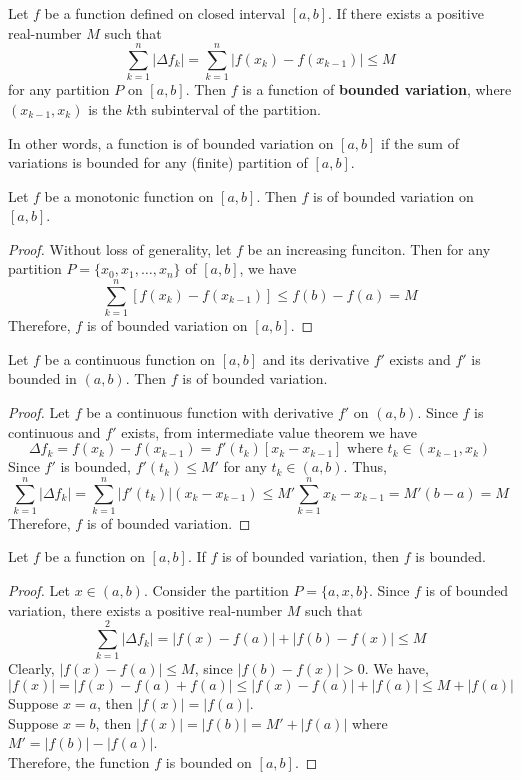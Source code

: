 \begin{definition}
	Let $f$ be a function defined on closed interval $[a,b]$.
	If there exists a positive real-number $M$ such that
	\[ \sum_{k=1}^n |\Delta f_k| = \sum_{k=1}^n |f(x_k) - f(x_{k-1})| \le M \]
	for any partition $P$ on $[a,b]$.
	Then $f$ is a function of \textbf{bounded variation}, where $(x_{k-1},x_k)$ is the $k$th subinterval of the partition.\\

\begin{commentary}
	In other words, a function is of bounded variation on $[a,b]$ if the sum of variations is bounded for any (finite) partition of $[a,b]$.
\end{commentary}
\end{definition}

\begin{theorem}
	Let $f$ be a monotonic function on $[a,b]$.
	Then $f$ is of bounded variation on $[a,b]$.
\end{theorem}
\begin{proof}
	Without loss of generality, let $f$ be an increasing funciton.
	Then for any partition $P = \{x_0,x_1,\dots,x_n\}$ of $[a,b]$, we have
	\[ \sum_{k=1}^n \left[ f(x_k)-f(x_{k-1}) \right] \le f(b)-f(a) = M \]
	Therefore, $f$ is of bounded variation on $[a,b]$.
\end{proof}

\begin{theorem}
	Let $f$ be a continuous function on $[a,b]$ and its derivative $f'$ exists and $f'$ is bounded in $(a,b)$.
	Then $f$ is of bounded variation.	
\end{theorem}
\begin{proof}
	Let $f$ be a continuous function with derivative $f'$ on $(a,b)$.
	Since $f$ is continuous and $f'$ exists, from intermediate value theorem we have
	\[ \Delta f_k = f(x_k) - f(x_{k-1}) = f'(t_k) [x_k-x_{k-1}] \text{ where } t_k \in (x_{k-1},x_k) \]
	Since $f'$ is bounded, $f'(t_k) \le M'$ for any $t_k \in (a,b)$.
	Thus,
	\[ \sum_{k=1}^n |\Delta f_k| = \sum_{k=1}^n |f'(t_k)| (x_k-x_{k-1}) \le M'\sum_{k=1}^n x_k-x_{k-1} = M'(b-a) = M \]
	Therefore, $f$ is of bounded variation.
\end{proof}

\begin{theorem}
	Let $f$ be a function on $[a,b]$.
	If $f$ is of bounded variation, then $f$ is bounded.
\end{theorem}
\begin{proof}
	Let $x \in (a,b)$.
	Consider the partition $P = \{ a,x,b \}$.
	Since $f$ is of bounded variation, there exists a positive real-number $M$ such that
	\[ \sum_{k=1}^2 |\Delta f_k| = |f(x)-f(a)| + |f(b)-f(x)| \le M \]
	Clearly, $|f(x)-f(a)| \le M$, since $|f(b)-f(x)| > 0$.
	We have,
	\[ |f(x)| = |f(x)-f(a)+f(a)| \le |f(x)-f(a)|+|f(a)| \le M+|f(a)| \]
	Suppose $x = a$, then $|f(x)| = |f(a)|$.\\
	Suppose $x = b$, then $|f(x)| = |f(b)| = M' + |f(a)|$ where $M' = |f(b)|-|f(a)|$.\\

	Therefore, the function $f$ is bounded on $[a,b]$.
\end{proof}

